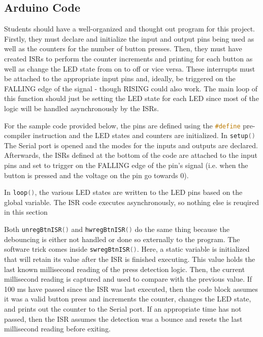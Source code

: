 \documentclass{article}
\begin{document}
    \subsection*{Arduino Code}
    Students should have a well-organized and thought out program for this project.
    Firstly, they must declare and initialize the input and output pins being used as well as the counters for the number of button presses.
    Then, they must have created ISRs to perform the counter increments and printing for each button as well as change the LED state from on to off or vice versa.
    These interrupts must be attached to the appropriate input pins and, ideally, be triggered on the FALLING edge of the signal - though RISING could also work.
    The main loop of this function should just be setting the LED state for each LED since most of the logic will be handled asynchronously by the ISRs.

    For the sample code provided below, the pins are defined using the \lstinline[language=C++, style=mystyle]{#define} pre-compiler instruction and the LED states and counters are initialized.
    In \lstinline[language=C++, style=mystyle]{setup()} The Serial port is opened and the modes for the inputs and outputs are declared.
    Afterwards, the ISRs defined at the bottom of the code are attached to the input pins and set to trigger on the FALLING edge of the pin's signal (i.e. when the button is pressed and the voltage on the pin go towards 0).

    In \lstinline[language=C++, style=mystyle]{loop()}, the various LED states are written to the LED pins based on the global variable.
    The ISR code executes asynchronously, so nothing else is reuqired in this section

    Both \lstinline[language=C++, style=mystyle]{unregBtnISR()} and \lstinline[language=C++, style=mystyle]{hwregBtnISR()} do the same thing because the debouncing is either not handled or done so externally to the program.
    The software trick comes inside \lstinline[language=C++, style=mystyle]{swregBtnISR()}.
    Here, a static variable is initialized that will retain its value after the ISR is finished executing.
    This value holds the last known millisecond reading of the press detection logic.
    Then, the current millisecond reading is captured and used to compare with the previous value.
    If 100 ms have passed since the ISR was last executed, then the code block assumes it was a valid button press and increments the counter, changes the LED state, and prints out the counter to the Serial port.
    If an appropriate time has not passed, then the ISR assumes the detection was a bounce and resets the last millisecond reading before exiting.

    \pagebreak
    
\end{document}
